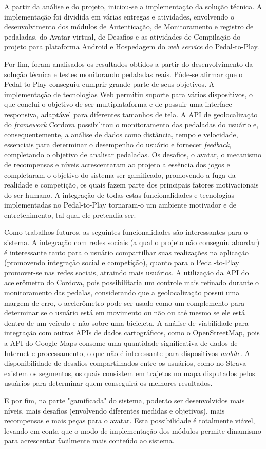 \par
A partir da análise e do projeto, iniciou-se a implementação da solução técnica. A implementação foi dividida em várias entregas e atividades, envolvendo o desenvolvimento dos módulos de Autenticação, de Monitoramento e registro de pedaladas, do Avatar virtual, de Desafios e as atividades de Compilação do projeto para plataforma Android e Hospedagem do \textit{web service} do Pedal-to-Play.
\par
Por fim, foram analisados os resultados obtidos a partir do desenvolvimento da solução técnica e testes monitorando pedaladas reais. Pôde-se afirmar que o Pedal-to-Play conseguiu cumprir grande parte de seus objetivos. A implementação de tecnologias Web permitiu suporte para vários dispositivos, o que conclui o objetivo de ser multiplataforma e de possuir uma interface responsiva, adaptável para diferentes tamanhos de tela. A API de geolocalização do \textit{framework} Cordova possibilitou o monitoramento das pedaladas do usuário e, consequentemente, a análise de dados como distância, tempo e velocidade, essenciais para determinar o desempenho do usuário e fornecer \textit{feedback}, completando o objetivo de analisar pedaladas. Os desafios, o avatar, o mecanismo de recompensas e níveis acrescentaram ao projeto a essência dos jogos e completaram o objetivo do sistema ser gamificado, promovendo a fuga da realidade e competição, os quais fazem parte dos principais fatores motivacionais do ser humano. A integração de todas estas funcionalidades e tecnologias implementadas no Pedal-to-Play tornaram-o um ambiente motivador e de entretenimento, tal qual ele pretendia ser.
\par
Como trabalhos futuros, as seguintes funcionalidades são interessantes para o sistema. A integração com redes sociais (a qual o projeto não conseguiu abordar) é interessante tanto para o usuário compartilhar suas realizações na aplicação (promovendo integração social e competição), quanto para o Pedal-to-Play promover-se nas redes sociais, atraindo mais usuários. A utilização da API do acelerômetro do Cordova, pois possibilitaria um controle mais refinado durante o monitoramento das pedalas, considerando que a geolocalização possui uma margem de erro, o acelerômetro pode ser usado como um complemento para determinar se o usuário está em movimento ou não ou até mesmo se ele está dentro de um veículo e não sobre uma bicicleta. A análise de viabilidade para integração com outras APIs de dados cartográficos, como o OpenStreetMap, pois a API do Google Maps consome uma quantidade significativa de dados de Internet e processamento, o que não é interessante para dispositivos \textit{mobile}. A disponibilidade de desafios compartilhados entre os usuários, como no Strava existem os segmentos, os quais consistem em trajetos no mapa disputados pelos usuários para determinar quem conseguirá os melhores resultados.
\par
E por fim, na parte "gamificada" do sistema, poderão ser desenvolvidos mais níveis, mais desafios (envolvendo diferentes medidas e objetivos), mais recompensas e mais peças para o avatar. Esta possibilidade é totalmente viável, levando em conta que o modo de implementação dos módulos permite dinamismo para acrescentar facilmente mais conteúdo ao sistema.
